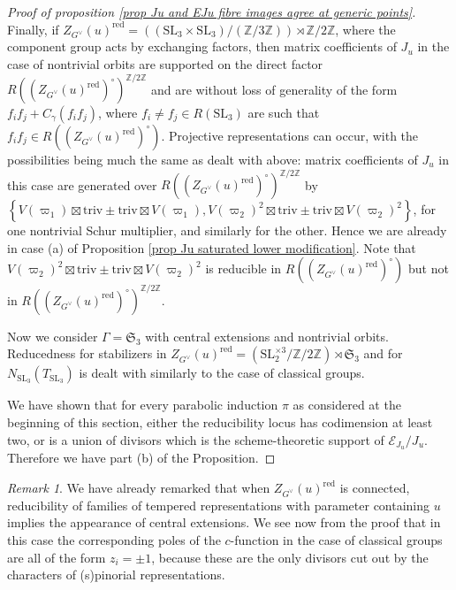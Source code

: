 \documentclass[10pt]{article}
\newcommand{\sett}[1]{\left\{#1\right\}}
\newcommand{\Ee}{\mathcal{E}}
\newcommand{\Z}{\mathbb{Z}}
\newcommand{\SL}{\mathrm{SL}}
\newcommand{\Sn}{\mathfrak{S}}
\newcommand{\An}{\mathfrak{A}}
\newcommand{\triv}{\mathrm{triv}}
\theoremstyle{definition}
\theoremstyle{remark}
\newtheorem{rem}{Remark}
\newcommand{\Zur}{Z_{G^\vee}(u)^{\mathrm{red}}}
\begin{document}
\begin{proof}[Proof of proposition \ref{prop Ju and EJu fibre images agree at generic points}]
Finally, if $\Zur=\left((\SL_3\times\SL_3)/(\Z/3\Z)\right)\rtimes\Z/2\Z$, where the 
component group acts by exchanging factors, then matrix coefficients of $J_u$
in the case of nontrivial orbits are supported on the direct factor $R((\Zur)^\circ)^{\Z/2\Z}$ and
are without loss of generality of the form
$f_if_j+C_\gamma(f_if_j)$, where $f_i\neq f_j\in R(\SL_3)$ are such that $f_if_j\in R((\Zur)^\circ)$. 
Projective representations can occur, with the possibilities being much the 
same as dealt with above: matrix coefficients of $J_u$ in this case are generated over
$R((\Zur)^\circ)^{\Z/2\Z}$ by $\sett{V(\varpi_1)\boxtimes\triv\pm\triv\boxtimes V(\varpi_1), V(\varpi_2)^2\boxtimes\triv\pm\triv\boxtimes V(\varpi_2)^2}$, for one nontrivial Schur multiplier, and 
similarly for the other. Hence we are already in case (a) of Proposition \ref{prop Ju saturated lower modification}.  Note that $V(\varpi_2)^2\boxtimes\triv\pm\triv\boxtimes V(\varpi_2)^2$ is
reducible in $R((\Zur)^\circ)$ but not in $R((\Zur)^\circ)^{\Z/2\Z}$. 

Now we consider $\Gamma=\Sn_3$ with central extensions and nontrivial orbits. Reducedness for stabilizers in
$\Zur=\left(\SL_2^{\times 3}/\Z/2\Z\right)\rtimes\Sn_3$ and for $N_{\SL_3}(T_{\SL_3})$ is dealt with similarly to the case of classical groups. 




%
We have shown that for every parabolic induction $\pi$ as considered at the beginning of this section, either the reducibility locus has codimension at least two, or is a union of divisors which is the scheme-theoretic support of $\Ee_{J_u}/J_u$. Therefore we have part (b) of the Proposition.
\end{proof}
%
\begin{rem}
We have already remarked that when $\Zur$ is connected, reducibility of families of tempered representations
with parameter containing $u$ implies the appearance of central extensions. We see now from the proof
that in this case the corresponding poles of the $c$-function in the case of classical groups are all of the 
form $z_i=\pm 1$, because these are the only divisors cut out by the characters of (s)pinorial representations. 
\end{rem}
%
\end{document}
